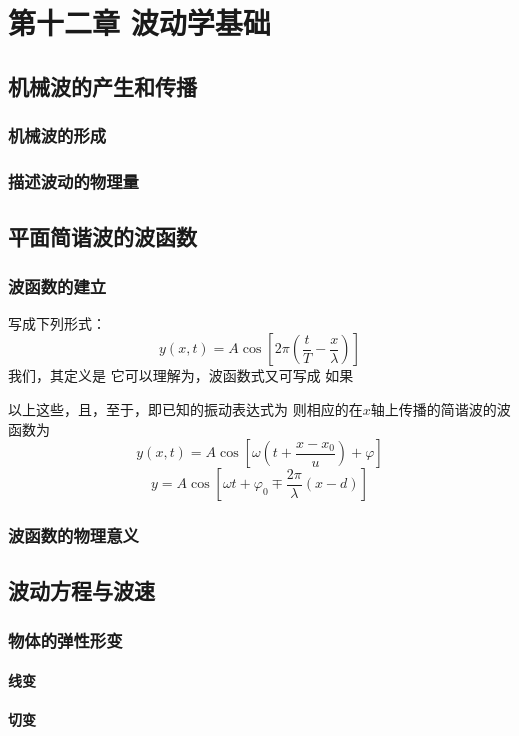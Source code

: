 \chapter{第十二章 波动学基础}

\section{机械波的产生和传播}
    \subsection{机械波的形成}
    \subsection{描述波动的物理量}

\section{平面简谐波的波函数}
    \subsection{波函数的建立}
    写成下列形式：
    \[
    y(x,t)=A\cos\left[2\pi\left(\frac{t}{T}-\frac{x}{\lambda}\right)\right]
    \]
    我们，其定义是
    它可以理解为，波函数式又可写成
    如果

    以上这些，且，至于，即已知的振动表达式为
    则相应的在$x$轴上传播的简谐波的波函数为
    \[
    y(x,t)=A\cos{\left[\omega\left(t+\frac{x-x_0}{u}\right)+\varphi\right]}
    \]
    \[
    y = A \cos\left[\omega t + \varphi_0 \mp \frac{2\pi}{\lambda} (x - d)\right]
    \]
    \subsection{波函数的物理意义}

\section{波动方程与波速}
    \subsection{物体的弹性形变}
        \subsubsection{线变}
        \subsubsection{切变}
